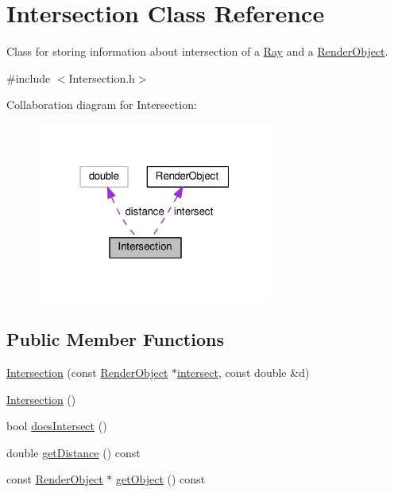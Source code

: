 \hypertarget{classIntersection}{}\section{Intersection Class Reference}
\label{classIntersection}


Class for storing information about intersection of a \hyperlink{classRay}{Ray} and a \hyperlink{classRenderObject}{Render\+Object}.  




{\ttfamily \#include $<$Intersection.\+h$>$}



Collaboration diagram for Intersection\+:\nopagebreak
\begin{figure}[H]
\begin{center}
\leavevmode
\includegraphics[width=220pt]{classIntersection__coll__graph}
\end{center}
\end{figure}
\subsection*{Public Member Functions}
\begin{DoxyCompactItemize}
\item 
\hyperlink{classIntersection_accfff54844dea1b64fce8ddb1c72f84d}{Intersection} (const \hyperlink{classRenderObject}{Render\+Object} $\ast$\hyperlink{classIntersection_a8241676dd0f240769dc189132dc3c5bb}{intersect}, const double \&d)
\item 
\hyperlink{classIntersection_a67497e3efe2793b23909052eeb82c4f3}{Intersection} ()
\item 
bool \hyperlink{classIntersection_a16a2464ecdda1f0c151436d27580241b}{does\+Intersect} ()
\item 
double \hyperlink{classIntersection_a18ecb6b6746d20976e3c53b92d1faaf3}{get\+Distance} () const 
\item 
const \hyperlink{classRenderObject}{Render\+Object} $\ast$ \hyperlink{classIntersection_a9d037e2c954f57dfa718a5cb3d96d58d}{get\+Object} () const 
\end{DoxyCompactItemize}
